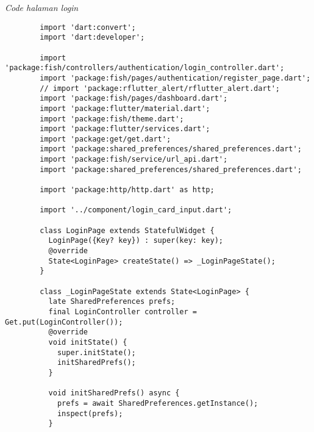 	
	\textit{Code halaman login}
	\begin{lstlisting}
        import 'dart:convert';
        import 'dart:developer';
        
        import 'package:fish/controllers/authentication/login_controller.dart';
        import 'package:fish/pages/authentication/register_page.dart';
        // import 'package:rflutter_alert/rflutter_alert.dart';
        import 'package:fish/pages/dashboard.dart';
        import 'package:flutter/material.dart';
        import 'package:fish/theme.dart';
        import 'package:flutter/services.dart';
        import 'package:get/get.dart';
        import 'package:shared_preferences/shared_preferences.dart';
        import 'package:fish/service/url_api.dart';
        import 'package:shared_preferences/shared_preferences.dart';
        
        import 'package:http/http.dart' as http;
        
        import '../component/login_card_input.dart';
        
        class LoginPage extends StatefulWidget {
          LoginPage({Key? key}) : super(key: key);
          @override
          State<LoginPage> createState() => _LoginPageState();
        }
        
        class _LoginPageState extends State<LoginPage> {
          late SharedPreferences prefs;
          final LoginController controller = Get.put(LoginController());
          @override
          void initState() {
            super.initState();
            initSharedPrefs();
          }
        
          void initSharedPrefs() async {
            prefs = await SharedPreferences.getInstance();
            inspect(prefs);
          }
        

\end{lstlisting}
